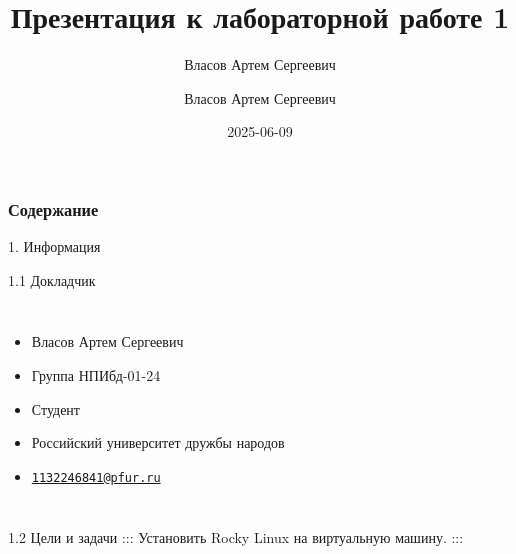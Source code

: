 \documentclass[
  ignorenonframetext,
  aspectratio=169,
]{beamer}
\title{Презентация к лабораторной работе 1}
\subtitle{Власов Артем Сергеевич}
\author{Власов Артем Сергеевич}
\date{2025-06-09}
\providecommand{\tightlist}{%
  \setlength{\itemsep}{0pt}\setlength{\parskip}{0pt}}\usepackage{longtable,booktabs,array}
\renewcommand*\contentsname{Содержание}
\newcommand\contentsname{Содержание}
\begin{document}
\frame{\titlepage}

\renewcommand*\contentsname{Содержание}
\begin{frame}[allowframebreaks]
  \frametitle{Содержание}
  \tableofcontents[hideallsubsections]
\end{frame}
\begin{frame}{1. Информация}
\label{ux438ux43dux444ux43eux440ux43cux430ux446ux438ux44f}
\begin{block}{1.1 Докладчик}
\label{ux434ux43eux43aux43bux430ux434ux447ux438ux43a}
\begin{columns}[c]
\begin{itemize}
\tightlist
\item
  Власов Артем Сергеевич
\item
  Группа НПИбд-01-24
\item
  Студент
\item
  Российский университет дружбы народов
\item
  \href{mailto:1132246841@pfur.ru}{\nolinkurl{1132246841@pfur.ru}}
\end{itemize}
\end{columns}
\end{block}

\begin{block}{1.2 Цели и задачи}
\label{ux446ux435ux43bux438-ux438-ux437ux430ux434ux430ux447ux438}
::: Установить Rocky Linux на виртуальную машину. :::
\end{block}
\end{frame}
\end{document}
